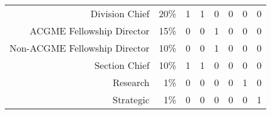 \begin{table}[H]
\begin{tabular}{|r|r|c|c|c|c|c|c|}
                     Division Chief &  20\% &     1 &      1 &    0 &      0 &    0 &      0 \\
          ACGME Fellowship Director &  15\% &     0 &      0 &    1 &      0 &    0 &      0 \\
      Non-ACGME Fellowship Director &  10\% &     0 &      0 &    1 &      0 &    0 &      0 \\
                      Section Chief &  10\% &     1 &      1 &    0 &      0 &    0 &      0 \\
                           Research &   1\% &     0 &      0 &    0 &      0 &    1 &      0 \\
                          Strategic &   1\% &     0 &      0 &    0 &      0 &    0 &      1 \\
\bottomrule
\end{tabular}
\end{table}
